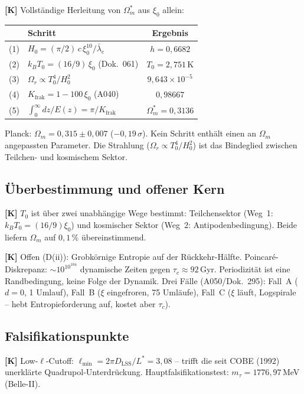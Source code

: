 \textbf{[K]} Vollständige Herleitung von $\Omega_m^*$ aus $\xi_0$ allein:
\begin{center}
	\small
	\begin{tabular}{clc}
		\toprule
		& Schritt & Ergebnis \\
		\midrule
		(1) & $H_0 = (\pi/2)\,c\,\xi_0^{10}/\bar\lambda_e$ & $h = 0{,}6682$ \\
		(2) & $k_BT_0 = (16/9)\,\xi_0$ (Dok.~061) & $T_0 = 2{,}751$\,K \\
		(3) & $\Omega_r \propto T_0^4/H_0^2$ & $9{,}643\times10^{-5}$ \\
		(4) & $K_\text{frak} = 1-100\,\xi_0$ (A040) & $0{,}98667$ \\
		(5) & $\int_0^\infty dz/E(z) = \pi/K_\text{frak}$ &
		$\boxed{\Omega_m^* = 0{,}3136}$ \\
		\bottomrule
	\end{tabular}
\end{center}
Planck: $\Omega_m = 0{,}315 \pm 0{,}007$ ($-0{,}19\,\sigma$).
Kein Schritt enthält einen an $\Omega_m$ angepassten Parameter.
Die Strahlung ($\Omega_r \propto T_0^4/H_0^2$) ist das Bindeglied
zwischen Teilchen- und kosmischem Sektor.

\subsection{Überbestimmung und offener Kern}

\textbf{[K]} $T_0$ ist über zwei unabhängige Wege bestimmt:
Teilchensektor (Weg~1: $k_BT_0 = (16/9)\xi_0$) und kosmischer Sektor
(Weg~2: Antipodenbedingung). Beide liefern $\Omega_m$ auf $0{,}1\,\%$
übereinstimmend.

\textbf{[K]} Offen (D(ii)): Grobkörnige Entropie auf der
Rückkehr-Hälfte. Poincar\'e-Diskrepanz: $\sim 10^{10^{104}}$ dynamische
Zeiten gegen $\tau_c \approx 92$\,Gyr. Periodizität ist eine
Randbedingung, keine Folge der Dynamik. Drei Fälle (A050/Dok.~295):
Fall~A ($d=0$, 1 Umlauf), Fall~B ($\xi$ eingefroren, 75 Umläufe),
Fall~C ($\xi$ läuft, Logspirale – hebt Entropieforderung auf,
kostet aber $\tau_c$).

\subsection{Falsifikationspunkte}

\textbf{[K]} Low-$\ell$-Cutoff: $\ell_\text{min} = 2\pi D_\text{LSS}/L^* = 3{,}08$
– trifft die seit COBE (1992) unerklärte Quadrupol-Unterdrückung.
Hauptfalsifikationstest: $m_\tau = 1776{,}97$\,MeV (Belle-II).

